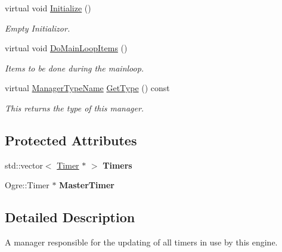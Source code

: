 \begin{DoxyCompactItemize}
virtual void \hyperlink{classphys_1_1TimerManager_ab6ee47352a406682178b4496544bcf6f}{Initialize} ()
\begin{DoxyCompactList}\small\item\em Empty Initializor. \item\end{DoxyCompactList}\item 
virtual void \hyperlink{classphys_1_1TimerManager_a98b7e74fe1e3eff7aee506477abe2a9c}{DoMainLoopItems} ()
\begin{DoxyCompactList}\small\item\em Items to be done during the mainloop. \item\end{DoxyCompactList}\item 
virtual \hyperlink{classphys_1_1ManagerBase_aaa6ccddf23892eaccb898529414f80a5}{ManagerTypeName} \hyperlink{classphys_1_1TimerManager_a716811f51cb9e97ed6e9db310f34e9dc}{GetType} () const 
\begin{DoxyCompactList}\small\item\em This returns the type of this manager. \item\end{DoxyCompactList}\end{DoxyCompactItemize}
\subsection*{Protected Attributes}
\begin{DoxyCompactItemize}
\item 
\hypertarget{classphys_1_1TimerManager_abaee576a7ee35350aac057c6970d0256}{
std::vector$<$ \hyperlink{classphys_1_1Timer}{Timer} $\ast$ $>$ {\bfseries Timers}}
\label{dc/d66/classphys_1_1TimerManager_abaee576a7ee35350aac057c6970d0256}

\item 
\hypertarget{classphys_1_1TimerManager_aa892d5ff53ecbe14f557baccdc16dc4f}{
Ogre::Timer $\ast$ {\bfseries MasterTimer}}
\label{dc/d66/classphys_1_1TimerManager_aa892d5ff53ecbe14f557baccdc16dc4f}

\end{DoxyCompactItemize}


\subsection{Detailed Description}
A manager responsible for the updating of all timers in use by this engine. 

